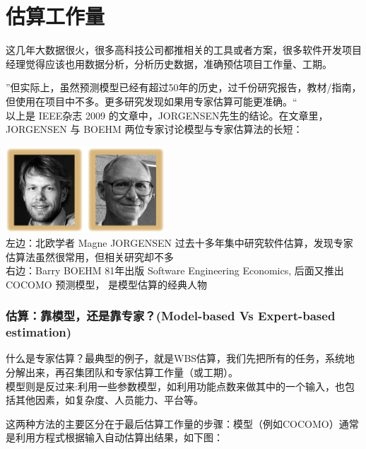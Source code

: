 \chapter{估算工作量} %

这几年大数据很火，很多高科技公司都推相关的工具或者方案，很多软件开发项目经理觉得应该也用数据分析，分析历史数据，准确预估项目工作量、工期。

''但实际上，虽然预测模型已经有超过50年的历史，过千份研究报告，教材/指南，但使用在项目中不多。更多研究发现如果用专家估算可能更准确。``\\
以上是 IEEE杂志 2009 的文章中，JORGENSEN先生的结论。在文章里，JORGENSEN
与 BOEHM 两位专家讨论模型与专家估算法的长短：


\includegraphics[width=6cm]{估算专家.png}\\

左边：北欧学者 Magne JORGENSEN
过去十多年集中研究软件估算，发现专家估算法虽然很常用，但相关研究却不多\\
右边：Barry BOEHM 81年出版 Software Engineering Economics, 后面又推出
COCOMO 预测模型， 是模型估算的经典人物

\hypertarget{ux4f30ux7b97ux9760ux6a21ux578bux8fd8ux662fux9760ux4e13ux5bb6model-based-vs-expert-based-estimation}{%
\subsection{估算：靠模型，还是靠专家？(Model-based Vs Expert-based
estimation)}\label{ux4f30ux7b97ux9760ux6a21ux578bux8fd8ux662fux9760ux4e13ux5bb6model-based-vs-expert-based-estimation}}

什么是专家估算？最典型的例子，就是WBS估算，我们先把所有的任务，系统地分解出来，再召集团队和专家估算工作量（或工期）。\\
模型则是反过来:利用一些参数模型，如利用功能点数来做其中的一个输入，也包括其他因素，如复杂度、人员能力、平台等。

 	
这两种方法的主要区分在于最后估算工作量的步骤：模型（例如COCOMO）通常是利用方程式根据输入自动估算出结果，如下图：

